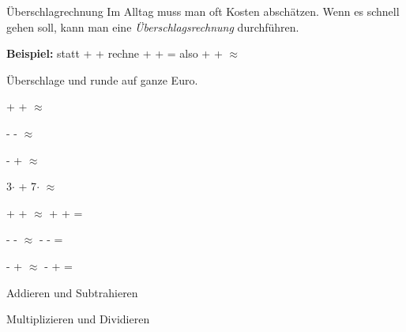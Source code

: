 \documentclass[12pt,a5paper,landscape]{scrartcl}
\begin{document}
	
	\begin{karte1}{Überschlagrechnung}
	Im Alltag muss man oft Kosten abschätzen. Wenn es schnell gehen soll, kann man eine \emph{Überschlagsrechnung} durchführen.

	\smallskip
	\textbf{Beispiel:} statt  +  +  rechne  +  +  =  also  +  +  $\approx$ 

	\smallskip
	Überschlage und runde auf ganze Euro.
	\begin{enumeratea}
		\item {} +  +  $\approx$ \linie[1cm]
		\item {} -  -  $\approx$ \linie[1cm]
		\item {} -  +  $\approx$ \linie[1cm]
		\item 3$\cdot$  + 7$\cdot$  $\approx$ \linie[1cm]
	\end{enumeratea}
	\end{karte1}
	
	\begin{loesungskarte}
	\begin{enumeratea}
		\item {} +  +  $\approx$  +  +  = \EUR{25}
		\item {} -  -  $\approx$  -  -  = \EUR{6}
		\item {} -  +  $\approx$  -  +  = \EUR{19}
	\end{enumeratea}
	\end{loesungskarte}
	
	\begin{karte1}{Addieren und Subtrahieren}
	\end{karte1}
	
	\begin{loesungskarte}
	\end{loesungskarte}
	
	\begin{karte1}{Multiplizieren und Dividieren}
	\end{karte1}
	
	\begin{loesungskarte}
	\end{loesungskarte}
	
\end{document}
